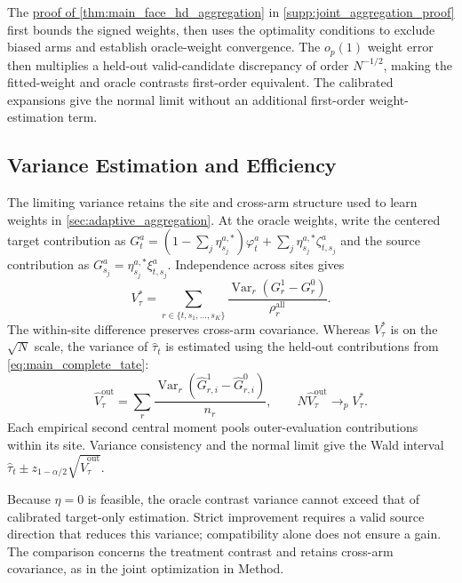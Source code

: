 \documentclass[12pt]{article}
\begin{document}
\begin{theorem}\label{thm:main_face_hd_aggregation}
\FACEHDJointAggregation
\end{theorem}

The \hyperref[proof:main_aggregation]{proof of \cref*{thm:main_face_hd_aggregation}} in \cref{supp:joint_aggregation_proof} first bounds the signed weights, then uses the optimality conditions to exclude biased arms and establish oracle-weight convergence. The $o_p(1)$ weight error then multiplies a held-out valid-candidate discrepancy of order $N^{-1/2}$, making the fitted-weight and oracle contrasts first-order equivalent. The calibrated expansions give the normal limit without an additional first-order weight-estimation term.

\subsection{Variance Estimation and Efficiency}\label{sec:theory_variance}

The limiting variance retains the site and cross-arm structure used to learn weights in \cref{sec:adaptive_aggregation}. At the oracle weights, write the centered target contribution as $G_t^a=(1-\sum_j\eta_{s_j}^{a,*})\varphi_t^a+\sum_j\eta_{s_j}^{a,*}\zeta_{t,s_j}^a$ and the source contribution as $G_{s_j}^a=\eta_{s_j}^{a,*}\xi_{t,s_j}^a$. Independence across sites gives
\[
V_\tau^*=\sum_{r\in\{t,s_1,\ldots,s_K\}}\frac{\operatorname{Var}_r(G_r^1-G_r^0)}{\rho_r^{\mathrm{all}}}.
\]
The within-site difference preserves cross-arm covariance. Whereas $V_\tau^*$ is on the $\sqrt N$ scale, the variance of $\widehat\tau_t$ is estimated using the held-out contributions from \cref{eq:main_complete_tate}:
\begin{equation}\label{eq:main_outer_tate_variance}
\widehat V_\tau^{\mathrm{out}}=\sum_r\frac{\widehat{\operatorname{Var}}_r(\widehat G_{r,i}^1-\widehat G_{r,i}^0)}{n_r},
\qquad N\widehat V_\tau^{\mathrm{out}}\to_p V_\tau^*.
\end{equation}
Each empirical second central moment pools outer-evaluation contributions within its site. Variance consistency and the normal limit give the Wald interval $\widehat\tau_t\pm z_{1-\alpha/2}\sqrt{\widehat V_\tau^{\mathrm{out}}}$.

Because $\eta=0$ is feasible, the oracle contrast variance cannot exceed that of calibrated target-only estimation. Strict improvement requires a valid source direction that reduces this variance; compatibility alone does not ensure a gain. The comparison concerns the treatment contrast and retains cross-arm covariance, as in the joint optimization in Method.
\end{document}
